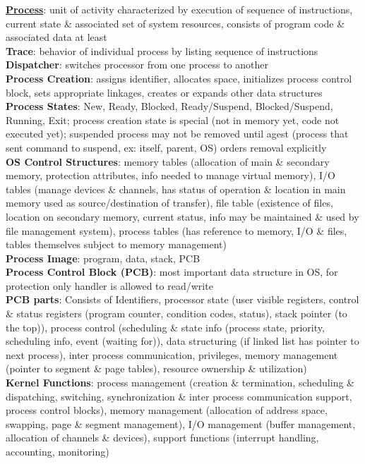 \documentclass[a4paper]{article}
\begin{document}
    \begin{multicols}{2}
        \scriptsize
        \noindent\underline{\textbf{Process}}: unit of activity characterized by execution of sequence of instructions, current state \& associated set of system resources, consists of program code \& associated data at least\\
        \textbf{Trace}: behavior of individual process by listing sequence of instructions\\
        \textbf{Dispatcher}: switches processor from one process to another\\
        \textbf{Process Creation}: assigns identifier, allocates space, initializes process control block, sets appropriate linkages, creates or expands other data structures\\
        \textbf{Process States}: New, Ready, Blocked, Ready/Suspend, Blocked/Suspend, Running, Exit; process creation state is special (not in memory yet, code not executed yet); suspended process may not be removed until agest (process that sent command to suspend, ex: itself, parent, OS) orders removal explicitly\\
        \textbf{OS Control Structures}: memory tables (allocation of main \& secondary memory, protection attributes, info needed to manage virtual memory), I/O tables (manage devices \& channels, has status of operation \& location in main memory used as source/destination of transfer), file table (existence of files, location on secondary memory, current status, info may be maintained \& used by file management system), process tables (has reference to memory, I/O \& files, tables themselves subject to memory management)\\
        \textbf{Process Image}: program, data, stack, PCB\\
        \textbf{Process Control Block (PCB)}: most important data structure in OS, for protection only handler is allowed to read/write\\
        \textbf{PCB parts}: Consists of Identifiers, processor state (user visible registers, control \& status registers (program counter, condition codes, status), stack pointer (to the top)), process control (scheduling \& state info (process state, priority, scheduling info, event (waiting for)), data structuring (if linked list has pointer to next process), inter process communication, privileges, memory management (pointer to segment \& page tables), resource ownership \& utilization)\\
        \textbf{Kernel Functions}: process management (creation \& termination, scheduling \& dispatching, switching, synchronization \& inter process communication support, process control blocks), memory management (allocation of address space, swapping, page \& segment management), I/O management  (buffer management, allocation of channels \& devices), support functions (interrupt handling, accounting, monitoring)\\

\end{multicols}
\end{document}
